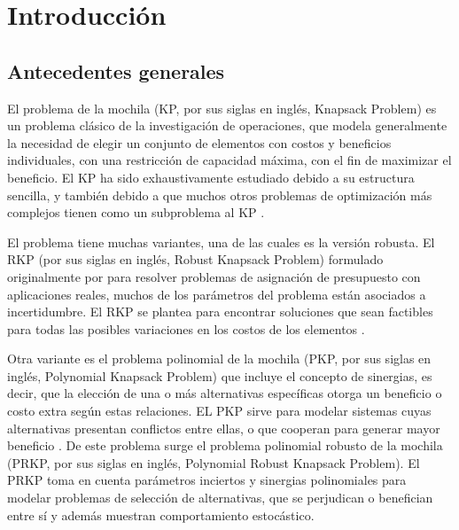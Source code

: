 \documentclass[spanish, a4paper, 12pt, twoside, openany,final]{book}
\numberwithin{equation}{section}
\begin{document}
\newpage
{ 
\listoffigures}


\newpage
{}   %
\setcounter{page}{1}                                    %


\chapter{Introducción}
\section{Antecedentes generales}

El problema de la mochila (KP, por sus siglas en inglés, Knapsack Problem) es un problema clásico de la investigación de operaciones, que modela generalmente la necesidad de elegir un conjunto de elementos con costos y beneficios individuales, con una restricción de capacidad máxima, con el fin de maximizar el beneficio. El KP ha sido exhaustivamente estudiado debido a su estructura sencilla, y también debido a que muchos otros problemas de optimización más complejos tienen como un subproblema al KP \citep*{martello_knapsack_1990}.

El problema tiene muchas  variantes, una de las cuales es la versión robusta. El RKP (por sus siglas en inglés, Robust Knapsack Problem) formulado originalmente por \cite{eilon_application_1987} para resolver problemas de asignación de presupuesto con aplicaciones reales, muchos de los parámetros del problema están asociados a incertidumbre. El RKP se plantea para encontrar soluciones que sean factibles para todas las posibles variaciones en los costos de los elementos \citep{monaci_exact_2013}.

Otra variante es el problema polinomial de la mochila (PKP, por sus siglas en inglés, Polynomial Knapsack Problem) que incluye el concepto de sinergias, es decir, que la elección de una o más alternativas específicas otorga un beneficio o costo extra según estas relaciones. EL PKP sirve para modelar sistemas cuyas alternativas presentan conflictos entre ellas, o que cooperan para generar mayor beneficio \citep{baldo_polynomial_2023}. De este problema surge el problema polinomial robusto de la mochila (PRKP, por sus siglas en inglés, Polynomial Robust Knapsack Problem). El PRKP toma en cuenta parámetros inciertos y sinergias polinomiales para modelar problemas de selección de alternativas, que se perjudican o benefician entre sí y además muestran comportamiento estocástico.
\end{document}
